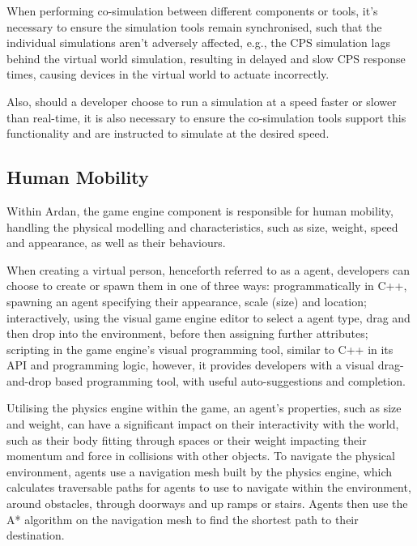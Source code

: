 When performing co-simulation between different components or tools, it's necessary to ensure the simulation tools remain synchronised, such that the individual simulations aren't adversely affected, e.g., the CPS simulation lags behind the virtual world simulation, resulting in delayed and slow CPS response times, causing devices in the virtual world to actuate incorrectly.

Also, should a developer choose to run a simulation at a speed faster or slower than real-time, it is also necessary to ensure the co-simulation tools support this functionality and are instructed to simulate at the desired speed.

\subsection{Human Mobility} %
\label{sub:human_mobility}
Within Ardan, the game engine component is responsible for human mobility, handling the physical modelling and characteristics, such as size, weight, speed and appearance, as well as their behaviours.

When creating a virtual person, henceforth referred to as a agent, developers can choose to create or spawn them in one of three ways: programmatically in C++, spawning an agent specifying their appearance, scale (size) and location; interactively, using the visual game engine editor to select a agent type, drag and then drop into the environment, before then assigning further attributes; scripting in the game engine's visual programming tool, similar to C++ in its API and programming logic, however, it provides developers with a visual drag-and-drop based programming tool, with useful auto-suggestions and completion.

Utilising the physics engine within the game, an agent's properties, such as size and weight, can have a significant impact on their interactivity with the world, such as their body fitting through spaces or their weight impacting their momentum and force in collisions with other objects. To navigate the physical environment, agents use a navigation mesh built by the physics engine, which calculates traversable paths for agents to use to navigate within the environment, around obstacles, through doorways and up ramps or stairs. Agents then use the A* algorithm on the navigation mesh to find the shortest path to their destination.


